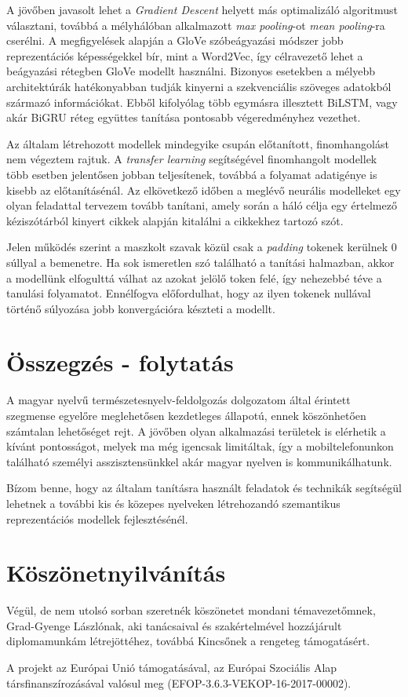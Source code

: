 A jövőben javasolt lehet a \textit{Gradient Descent} helyett más optimalizáló algoritmust választani, továbbá a mélyhálóban alkalmazott \textit{max pooling}-ot \textit{mean pooling}-ra cserélni. A megfigyelések alapján a GloVe szóbeágyazási módszer jobb reprezentációs képességekkel bír, mint a Word2Vec, így célravezető lehet a beágyazási rétegben GloVe modellt használni. Bizonyos esetekben a mélyebb architektúrák hatékonyabban tudják kinyerni a szekvenciális szöveges adatokból származó információkat. Ebből kifolyólag több egymásra illesztett BiLSTM, vagy akár BiGRU réteg együttes tanítása pontosabb végeredményhez vezethet.

Az általam létrehozott modellek mindegyike csupán előtanított, finomhangolást nem végeztem rajtuk. A \textit{transfer learning} segítségével finomhangolt modellek több esetben jelentősen jobban teljesítenek, továbbá a folyamat adatigénye is kisebb az előtanításénál. Az elkövetkező időben a meglévő neurális modelleket egy olyan feladattal tervezem tovább tanítani, amely során a háló célja egy értelmező kéziszótárból kinyert cikkek alapján kitalálni a cikkekhez tartozó szót.

Jelen működés szerint a maszkolt szavak közül csak a \textit{padding} tokenek kerülnek 0 súllyal a bemenetre. Ha sok ismeretlen szó található a tanítási halmazban, akkor a modellünk elfogulttá válhat az azokat jelölő token felé, így nehezebbé téve a tanulási folyamatot. Ennélfogva előfordulhat, hogy az ilyen tokenek nullával történő súlyozása jobb konvergációra készteti a modellt.

\pagebreak

\section*{Összegzés - folytatás}

A magyar nyelvű természetesnyelv-feldolgozás dolgozatom által érintett szegmense egyelőre meglehetősen kezdetleges állapotú, ennek köszönhetően számtalan lehetőséget rejt. A jövőben olyan alkalmazási területek is elérhetik a kívánt pontosságot, melyek ma még igencsak limitáltak, így a mobiltelefonunkon található személyi asszisztensünkkel akár magyar nyelven is kommunikálhatunk.

Bízom benne, hogy az általam tanításra használt feladatok és technikák segítségül lehetnek a további kis és közepes nyelveken létrehozandó szemantikus reprezentációs modellek fejlesztésénél.


\section{Köszönetnyilvánítás}

Végül, de nem utolsó sorban szeretnék köszönetet mondani témavezetőmnek, Grad-Gyenge Lászlónak, aki tanácsaival és szakértelmével hozzájárult diplomamunkám létrejöttéhez, továbbá Kincsőnek a rengeteg támogatásért.

A projekt az Európai Unió támogatásával, az Európai Szociális Alap
társfinanszírozásával valósul meg (EFOP-3.6.3-VEKOP-16-2017-00002).

